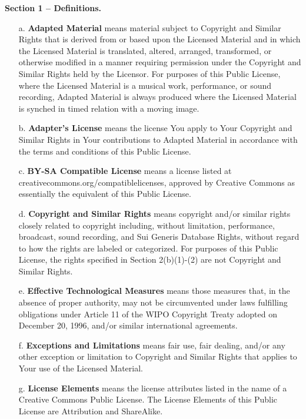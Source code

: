 \begin{center}
    \textbf{Section 1 -- Definitions.}
\end{center}

\begin{itemize}
    \item[a.] \textbf{Adapted Material} means material subject to Copyright and Similar Rights that is derived from or based upon the Licensed Material and in which the Licensed Material is translated, altered, arranged, transformed, or otherwise modified in a manner requiring permission under the Copyright and Similar Rights held by the Licensor. For purposes of this Public License, where the Licensed Material is a musical work, performance, or sound recording, Adapted Material is always produced where the Licensed Material is synched in timed relation with a moving image.
    \item[b.] \textbf{Adapter's License} means the license You apply to Your Copyright and Similar Rights in Your contributions to Adapted Material in accordance with the terms and conditions of this Public License.
    \item[c.] \textbf{BY-SA Compatible License} means a license listed at creativecommons.org/compatiblelicenses, approved by Creative Commons as essentially the equivalent of this Public License.
    \item[d.] \textbf{Copyright and Similar Rights} means copyright and/or similar rights closely related to copyright including, without limitation, performance, broadcast, sound recording, and Sui Generis Database Rights, without regard to how the rights are labeled or categorized. For purposes of this Public License, the rights specified in Section 2(b)(1)-(2) are not Copyright and Similar Rights.
    \item[e.] \textbf{Effective Technological Measures} means those measures that, in the absence of proper authority, may not be circumvented under laws fulfilling obligations under Article 11 of the WIPO Copyright Treaty adopted on December 20, 1996, and/or similar international agreements.
    \item[f.] \textbf{Exceptions and Limitations} means fair use, fair dealing, and/or any other exception or limitation to Copyright and Similar Rights that applies to Your use of the Licensed Material.
    \item[g.] \textbf{License Elements} means the license attributes listed in the name of a Creative Commons Public License. The License Elements of this Public License are Attribution and ShareAlike.

\end{itemize}
